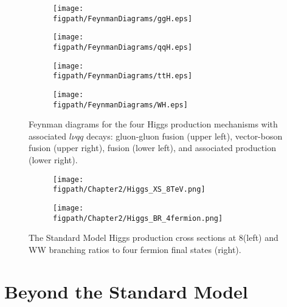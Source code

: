 \begin{figure}[bt]
	\centering
	\begin{subfigure}[t]{0.415\textwidth}
		\texttt{[image: \\figpath/FeynmanDiagrams/ggH.eps]}
		\label{fig:ggH}
	\end{subfigure}%
	\begin{subfigure}[t]{0.415\textwidth}
		\texttt{[image: \\figpath/FeynmanDiagrams/qqH.eps]}
		\label{fig:qqH}
	\end{subfigure}

	\begin{subfigure}[t]{0.415\textwidth}
		\texttt{[image: \\figpath/FeynmanDiagrams/ttH.eps]}
		\label{fig:ttH}
	\end{subfigure}%
	\begin{subfigure}[t]{0.415\textwidth}
		\texttt{[image: \\figpath/FeynmanDiagrams/WH.eps]}
		\label{fig:WH}
	\end{subfigure}
	\caption{Feynman diagrams for the four Higgs production mechanisms with associated $l{\nu}qq$ decays: gluon-gluon fusion (upper left), vector-boson fusion (upper right), \ttbar fusion (lower left), and associated production (lower right).}
	\label{fig:Higgs_WW_lnujj_feynman}
\end{figure}

\begin{figure}[!hbt]
	\centering
	\begin{subfigure}[t]{0.54\textwidth}
		\texttt{[image: \\figpath/Chapter2/Higgs\_XS\_8TeV.png]}
		\label{fig:Higgs_XS_8TeV}
	\end{subfigure}
	\begin{subfigure}[t]{0.41\textwidth}
		\texttt{[image: \\figpath/Chapter2/Higgs\_BR\_4fermion.png]}
		\label{fig:Higgs_BR_4fermion}
	\end{subfigure}
	\caption{The Standard Model Higgs production cross sections at 8\tev (left) and WW branching ratios to four fermion final states (right).}
	\label{fig:Higgs_XS_and_BR}
\end{figure}


\section{Beyond the Standard Model}